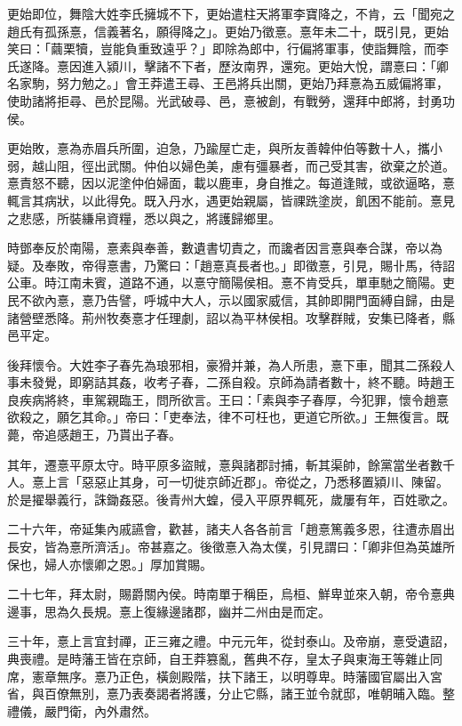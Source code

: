 \begin{pinyinscope}
更始即位，舞陰大姓李氏擁城不下，更始遣柱天將軍李寶降之，不肯，云「聞宛之趙氏有孤孫憙，信義著名，願得降之」。更始乃徵憙。憙年未二十，既引見，更始笑曰：「繭栗犢，豈能負重致遠乎？」即除為郎中，行偏將軍事，使詣舞陰，而李氏遂降。憙因進入潁川，擊諸不下者，歷汝南界，還宛。更始大悅，謂憙曰：「卿名家駒，努力勉之。」會王莽遣王尋、王邑將兵出關，更始乃拜憙為五威偏將軍，使助諸將拒尋、邑於昆陽。光武破尋、邑，憙被創，有戰勞，還拜中郎將，封勇功侯。

更始敗，憙為赤眉兵所圍，迫急，乃踰屋亡走，與所友善韓仲伯等數十人，攜小弱，越山阻，徑出武關。仲伯以婦色美，慮有彊暴者，而己受其害，欲棄之於道。憙責怒不聽，因以泥塗仲伯婦面，載以鹿車，身自推之。每道逢賊，或欲逼略，憙輒言其病狀，以此得免。既入丹水，遇更始親屬，皆祼跣塗炭，飢困不能前。憙見之悲感，所裝縑帛資糧，悉以與之，將護歸鄉里。

時鄧奉反於南陽，憙素與奉善，數遺書切責之，而讒者因言憙與奉合謀，帝以為疑。及奉敗，帝得憙書，乃驚曰：「趙憙真長者也。」即徵憙，引見，賜卝馬，待詔公車。時江南未賓，道路不通，以憙守簡陽侯相。憙不肯受兵，單車馳之簡陽。吏民不欲內憙，憙乃告譬，呼城中大人，示以國家威信，其帥即開門面縛自歸，由是諸營壁悉降。荊州牧奏憙才任理劇，詔以為平林侯相。攻擊群賊，安集已降者，縣邑平定。

後拜懷令。大姓李子春先為琅邪相，豪猾并兼，為人所患，憙下車，聞其二孫殺人事未發覺，即窮詰其姦，收考子春，二孫自殺。京師為請者數十，終不聽。時趙王良疾病將終，車駕親臨王，問所欲言。王曰：「素與李子春厚，今犯罪，懷令趙憙欲殺之，願乞其命。」帝曰：「吏奉法，律不可枉也，更道它所欲。」王無復言。既薨，帝追感趙王，乃貰出子春。

其年，遷憙平原太守。時平原多盜賊，憙與諸郡討捕，斬其渠帥，餘黨當坐者數千人。憙上言「惡惡止其身，可一切徙京師近郡」。帝從之，乃悉移置潁川、陳留。於是擢舉義行，誅鋤姦惡。後青州大蝗，侵入平原界輒死，歲屢有年，百姓歌之。

二十六年，帝延集內戚讌會，歡甚，諸夫人各各前言「趙憙篤義多恩，往遭赤眉出長安，皆為憙所濟活」。帝甚嘉之。後徵憙入為太僕，引見謂曰：「卿非但為英雄所保也，婦人亦懷卿之恩。」厚加賞賜。

二十七年，拜太尉，賜爵關內侯。時南單于稱臣，烏桓、鮮卑並來入朝，帝令憙典邊事，思為久長規。憙上復緣邊諸郡，幽并二州由是而定。

三十年，憙上言宜封禪，正三雍之禮。中元元年，從封泰山。及帝崩，憙受遺詔，典喪禮。是時藩王皆在京師，自王莽篡亂，舊典不存，皇太子與東海王等雜止同席，憲章無序。憙乃正色，橫劍殿階，扶下諸王，以明尊卑。時藩國官屬出入宮省，與百僚無別，憙乃表奏謁者將護，分止它縣，諸王並令就邸，唯朝晡入臨。整禮儀，嚴門衛，內外肅然。


\end{pinyinscope}
